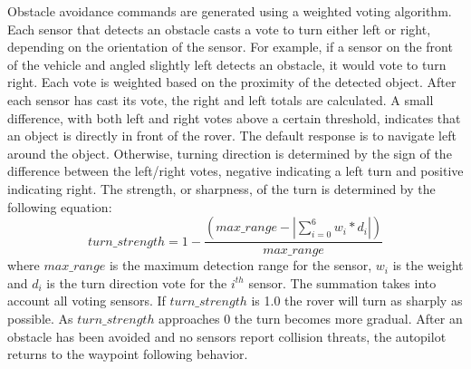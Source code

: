 %
%
%

Obstacle avoidance commands are generated using a weighted voting algorithm.  
%
Each sensor that detects an obstacle casts a vote to turn either left or right, depending on the orientation of the sensor. 
%
For example, if a sensor on the front of the vehicle
and angled slightly left detects an obstacle, it would vote to turn right. 
%
Each vote is weighted based on the proximity of the detected object.
%
%
After each sensor has cast its vote, the right and left totals are calculated.
%
A small difference, with both left and right votes above a certain threshold,
indicates that an object is directly in front of the rover.  
%
The default response is to navigate left around the object. 
%
Otherwise, turning direction is determined by the sign of the difference between the left/right votes, negative indicating a left turn and positive indicating right. 
%
The strength, or sharpness, of the turn is determined by the following equation:
\begin{equation}
turn\_strength = 1 - \frac{(max\_range - \left | {\sum_{i=0}^{6}w_i * d_i} \right |)}{max\_range}
\label{eq:turn}
\end{equation}
\noindent
where $max\_range$ is the maximum detection range for the sensor,
$w_i$ is the weight and $d_i$ is the turn direction vote for the $i^{th}$ sensor.  
%
The summation takes into account all voting sensors.
%
%
If $turn\_strength$ is 1.0 the rover will turn as sharply as possible.
%
As $turn\_strength$ approaches 0 the turn becomes more gradual.
%
After an obstacle has been avoided and no sensors report collision threats, 
the autopilot returns to the waypoint following behavior. 


